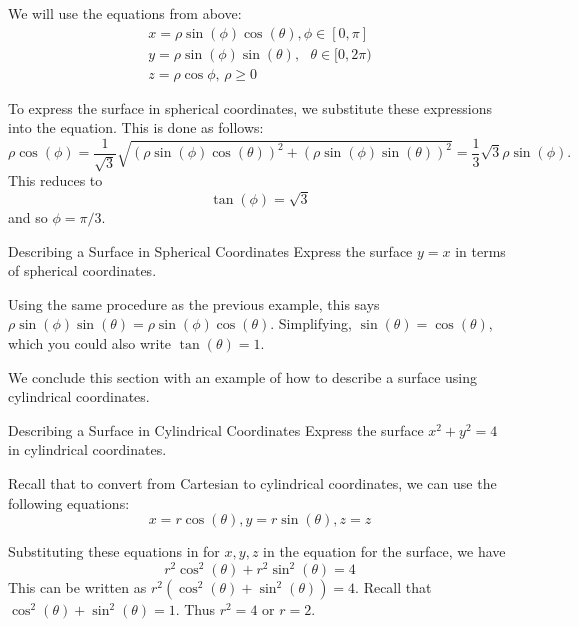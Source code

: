 \begin{solution}
We will use the equations from above:
\[
\begin{array}{l}
x =\rho \sin \left( \phi \right) \cos \left( \theta \right), \phi \in 
\left[ 0,\pi \right]\\
 y =\rho \sin \left( \phi \right) \sin \left( \theta \right) ,\text{ }\theta
\in \lbrack 0,2\pi ) \\
 z =\rho \cos \phi \text{, }\rho \geq 0
\end{array}
\]

To express the surface in spherical coordinates, we substitute these expressions into the equation.  
This is done as follows:
\begin{equation*}
\rho \cos \left( \phi \right) =\frac{1}{\sqrt{3}}\sqrt{\left( \rho \sin
\left( \phi \right) \cos \left( \theta \right) \right) ^{2}+\left( \rho \sin
\left( \phi \right) \sin \left( \theta \right) \right) ^{2}}=\allowbreak 
\frac{1}{3}\sqrt{3}\rho \sin \left( \phi \right).
\end{equation*}
This reduces to 
\begin{equation*}
\tan \left( \phi \right)=\sqrt{3}
\end{equation*}
and so $\phi =\pi /3$.
\end{solution}

\begin{example}{Describing a Surface in Spherical Coordinates}
Express the surface $y=x$ in terms of spherical coordinates.
\end{example}

\begin{solution}
Using the same procedure as the previous example, this says $\allowbreak \rho \sin \left( \phi \right) \sin \left( \theta
\right) =\rho \sin \left( \phi \right) \cos \left( \theta \right)$. Simplifying,  $\sin \left( \theta \right) =\cos \left( \theta \right)$, which you could also write $\tan \left( \theta \right)=1$.
\end{solution}

We conclude this section with an example of how to describe a surface using cylindrical coordinates. 

\begin{example}{Describing a Surface in Cylindrical Coordinates}
Express the surface $x^{2}+y^{2}=4$ in cylindrical coordinates.
\end{example}

\begin{solution}
Recall that to convert from Cartesian to cylindrical coordinates, we can use the following equations:
\[
x =r\cos \left( \theta \right) , y=r\sin \left( \theta \right) , z =z
\]

Substituting these equations in for $x,y,z$ in the equation for the surface, we have  
\[
r^{2}\cos ^{2} \left( \theta \right) +r^{2}\sin ^{2} \left( \theta \right)=4
\]
This can be written as $r^2 ( \cos^{2} \left( \theta \right)+ \sin^{2} \left(\theta\right) ) = 4$. Recall that $ \cos^{2} \left( \theta \right)+ \sin^{2} \left( \theta \right)=1$.  Thus $r^{2} = 4$ or $r=2$.
\end{solution}